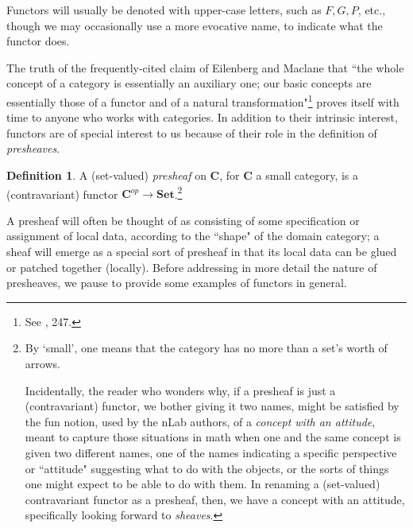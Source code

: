 \documentclass[11pt]{book}
\theoremstyle{definition}
\theoremstyle{definition}
\newtheorem{definition}{Definition}[section]
\theoremstyle{definition}
\theoremstyle{theorem}
\theoremstyle{definition}
\begin{document}
Functors will usually be denoted with upper-case letters, such as $F, G, P$, etc., though we may occasionally use a more evocative name, to indicate what the functor does. \par 
The truth of the frequently-cited claim of Eilenberg and Maclane that ``the whole concept of a category is essentially an auxiliary one; our basic concepts are essentially those of a functor and of a natural transformation"\footnote{See \cite{maclane_general_1945}, 247.} proves itself with time to anyone who works with categories. In addition to their intrinsic interest, functors are of special interest to us because of their role in the definition of \textit{presheaves}.   
\begin{definition}
	A (set-valued) \textit{presheaf}  on \textbf{C}, for \textbf{C} a small category, is a (contravariant) functor $\textbf{C}^{op} \rightarrow \textbf{Set}$.\footnote{By `small', one means that the category has no more than a set's worth of arrows. \par 
	Incidentally, the reader who wonders why, if a presheaf is just a (contravariant) functor, we bother giving it two names, might be satisfied by the fun notion, used by the nLab authors, of a \textit{concept with an attitude}, meant to capture those situations in math when one and the same concept is given two different names, one of the names indicating a specific perspective or ``attitude" suggesting what to do with the objects, or the sorts of things one might expect to be able to do with them. In renaming a (set-valued) contravariant functor as a presheaf, then, we have a concept with an attitude, specifically looking forward to \textit{sheaves}.}   
\end{definition} \noindent 
A presheaf will often be thought of as consisting of some specification or assignment of local data, according to the ``shape" of the domain category; a sheaf will emerge as a special sort of presheaf in that its local data can be glued or patched together (locally). Before addressing in more detail the nature of presheaves, we pause to provide some examples of functors in general.
\end{document}

